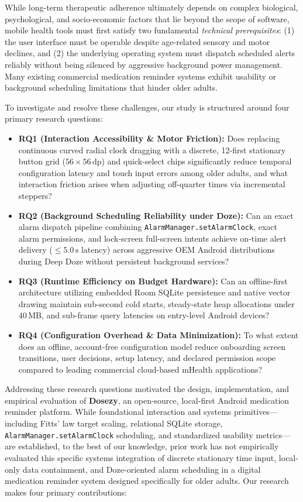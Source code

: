 \documentclass[11pt,a4paper]{article}
\begin{document}
While long-term therapeutic adherence ultimately depends on complex biological, psychological, and socio-economic factors that lie beyond the scope of software, mobile health tools must first satisfy two fundamental \emph{technical prerequisites}: (1) the user interface must be operable despite age-related sensory and motor declines, and (2) the underlying operating system must dispatch scheduled alerts reliably without being silenced by aggressive background power management. Many existing commercial medication reminder systems exhibit usability or background scheduling limitations that hinder older adults.

To investigate and resolve these challenges, our study is structured around four primary research questions:
\begin{itemize}[leftmargin=*]
    \item \textbf{RQ1 (Interaction Accessibility \& Motor Friction):} Does replacing continuous curved radial clock dragging with a discrete, 12-first stationary button grid ($56\times56\,\text{dp}$) and quick-select chips significantly reduce temporal configuration latency and touch input errors among older adults, and what interaction friction arises when adjusting off-quarter times via incremental steppers?
    \item \textbf{RQ2 (Background Scheduling Reliability under Doze):} Can an exact alarm dispatch pipeline combining \texttt{AlarmManager.setAlarmClock}, exact alarm permissions, and lock-screen full-screen intents achieve on-time alert delivery ($\le 5.0\,\text{s}$ latency) across aggressive OEM Android distributions during Deep Doze without persistent background services?
    \item \textbf{RQ3 (Runtime Efficiency on Budget Hardware):} Can an offline-first architecture utilizing embedded Room SQLite persistence and native vector drawing maintain sub-second cold starts, steady-state heap allocations under $40\,\text{MB}$, and sub-frame query latencies on entry-level Android devices?
    \item \textbf{RQ4 (Configuration Overhead \& Data Minimization):} To what extent does an offline, account-free configuration model reduce onboarding screen transitions, user decisions, setup latency, and declared permission scope compared to leading commercial cloud-based mHealth applications?
\end{itemize}

Addressing these research questions motivated the design, implementation, and empirical evaluation of \textbf{Dosezy}, an open-source, local-first Android medication reminder platform. While foundational interaction and systems primitives---including Fitts' law target scaling, relational SQLite storage, \texttt{AlarmManager.setAlarmClock} scheduling, and standardized usability metrics---are established, to the best of our knowledge, prior work has not empirically evaluated this specific systems integration of discrete stationary time input, local-only data containment, and Doze-oriented alarm scheduling in a digital medication reminder system designed specifically for older adults. Our research makes four primary contributions:
\end{document}
